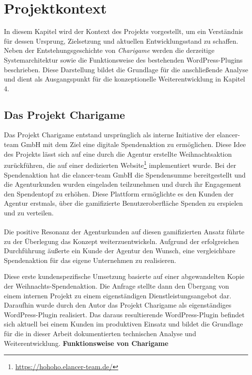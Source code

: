 \chapter{Projektkontext}
\label{chap:context}
In diesem Kapitel wird der Kontext des Projekts vorgestellt, um ein Verständnis für dessen Ursprung, Zielsetzung und aktuellen Entwicklungsstand zu schaffen.
Neben der Entstehungsgeschichte von \textit{Charigame} werden die derzeitige Systemarchitektur sowie die Funktionsweise des bestehenden WordPress-Plugins beschrieben.
Diese Darstellung bildet die Grundlage für die anschließende Analyse und dient als Ausgangspunkt für die konzeptionelle Weiterentwicklung in Kapitel 4.
\section{Das Projekt Charigame}

Das Projekt Charigame entstand ursprünglich als interne Initiative der elancer-team GmbH mit dem Ziel eine digitale Spendenaktion zu ermöglichen.
Diese Idee des Projekts lässt sich auf eine durch die Agentur erstellte Weihnachtsaktion zurückführen, die auf einer dedizierten Website\footnote{\url{https://hohoho.elancer-team.de/}} implementiert wurde.
Bei der Spendenaktion hat die elancer-team GmbH die Spendensumme bereitgestellt und die Agenturkunden wurden eingeladen teilzunehmen und durch ihr Engagement den Spendentopf zu erhöhen.
Diese Plattform ermöglichte es den Kunden der Agentur erstmals, über die gamifizierte Benutzeroberfläche Spenden zu erspielen und zu verteilen.
\\\\
Die positive Resonanz der Agenturkunden auf diesen gamifizierten Ansatz führte zu der Überlegung das Konzept weiterzuentwickeln.
Aufgrund der erfolgreichen Durchführung äußerte ein Kunde der Agentur den Wunsch, eine vergleichbare Spendenaktion für das eigene Unternehmen zu realisieren.

Diese erste kundenspezifische Umsetzung basierte auf einer abgewandelten Kopie der Weihnachts-Spendenaktion.
Die Anfrage stellte dann den Übergang von einem internen Projekt zu einem eigenständigen Dienstleistungsangebot dar.
Daraufhin wurde durch den Autor das Projekt Charigame als eigenständiges WordPress-Plugin realisiert.
Das daraus resultierende WordPress-Plugin befindet sich aktuell bei einem Kunden im produktiven Einsatz und bildet die Grundlage für die in dieser Arbeit dokumentierten technischen Analyse und Weiterentwicklung.
\newpage
\textbf{Funktionsweise von Charigame}

